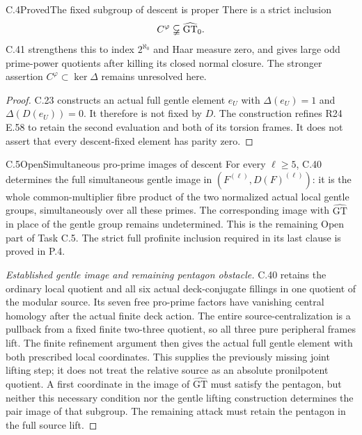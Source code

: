 \begin{statement}{C.4}{Proved}{The fixed subgroup of descent is proper}
There is a strict inclusion
\[
                 C^\varphi\varsubsetneqq\widehat{\mathrm{GT}}_0.
\]
C.41 strengthens this to index $2^{\aleph_0}$ and Haar measure zero,
and gives large odd prime-power quotients after killing its closed
normal closure. The stronger assertion
$C^\varphi\subset\ker\Delta$ remains unresolved here.
\end{statement}
\begin{proof}
C.23 constructs an actual full gentle element $e_U$ with
$\Delta(e_U)=1$ and $\Delta(D(e_U))=0$.
It therefore is not fixed by $D$. The construction refines
R24 E.58 to retain the second evaluation and both of its
torsion frames. It does not assert that every descent-fixed
element has parity zero.
\end{proof}

\begin{statement}{C.5}{Open}{Simultaneous pro-prime images of descent}
For every $\ell\geq5$, C.40 determines the full simultaneous
gentle image in $(F^{(\ell)},D(F)^{(\ell)})$: it is the whole
common-multiplier fibre product of the two normalized actual
local gentle groups, simultaneously over all these primes.
The corresponding image with $\widehat{\mathrm{GT}}$ in place
of the gentle group remains undetermined. This is the remaining
Open part of Task C.5. The strict full profinite inclusion
required in its last clause is proved in P.4.
\end{statement}
\begin{proof}[Established gentle image and remaining pentagon obstacle]
C.40 retains the ordinary local quotient and all six actual
deck-conjugate fillings in one quotient of the modular source.
Its seven free pro-prime factors have vanishing central
homology after the actual finite deck action. The entire
source-centralization is a pullback from a fixed finite
two-three quotient, so all three pure peripheral frames lift.
The finite refinement argument then gives the actual full
gentle element with both prescribed local coordinates.
This supplies the previously missing joint lifting step;
it does not treat the relative source as an absolute
pronilpotent quotient. A first coordinate in the image of
$\widehat{\mathrm{GT}}$ must satisfy the pentagon, but neither
this necessary condition nor the gentle lifting construction
determines the pair image of that subgroup. The remaining
attack must retain the pentagon in the full source lift.
\end{proof}

